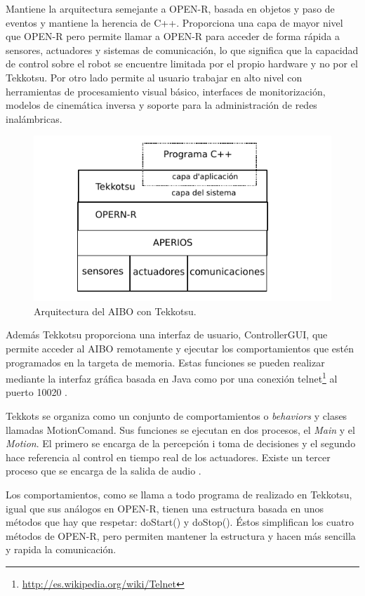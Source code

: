 \documentclass[12pt,a4paper,final,twoside]{book}
\begin{document}
Mantiene la arquitectura semejante a OPEN-R, basada en objetos y paso de eventos y mantiene la herencia de C++. Proporciona una capa de mayor nivel que OPEN-R pero permite llamar a OPEN-R para acceder de forma rápida a sensores, actuadores y sistemas de comunicación, lo que significa que la capacidad de control sobre el robot se encuentre limitada por el propio hardware y no por el Tekkotsu. Por otro lado permite al usuario trabajar en alto nivel con herramientas de procesamiento visual básico, interfaces de monitorización, modelos de cinemática inversa y soporte para la administración de redes inalámbricas.
 
\begin{figure}[h!]
	\centering
    \includegraphics[scale=1.2]{images/tekk.pdf}
	 \caption{Arquitectura del AIBO con Tekkotsu.}
  \label{fig:tekk}
\end{figure}

Además Tekkotsu proporciona una interfaz de usuario, ControllerGUI, que permite acceder al AIBO remotamente y ejecutar los comportamientos que estén programados en la targeta de memoria. Estas funciones se pueden realizar mediante la interfaz gráfica basada en Java como por una conexión telnet\footnote{\url{http://es.wikipedia.org/wiki/Telnet}} al puerto 10020 \cite{TekkQuickRef}.

Tekkots se organiza como un conjunto de comportamientos o \textit{behaviors} y clases llamadas MotionComand. Sus funciones se ejecutan en dos procesos, el \textit{Main} y el \textit{Motion}. El primero se encarga de la percepción i toma de decisiones y el segundo hace referencia al control en tiempo real de los actuadores. Existe un tercer proceso que se encarga de la salida de audio \cite{tekkTut}. 

Los comportamientos, como se llama a todo programa de realizado en Tekkotsu, igual que sus análogos en OPEN-R, tienen una estructura basada en unos métodos que hay que respetar: doStart() y doStop(). Éstos simplifican los cuatro métodos de OPEN-R, pero permiten mantener la estructura y hacen más sencilla y rapida la comunicación.
  
\end{document}
